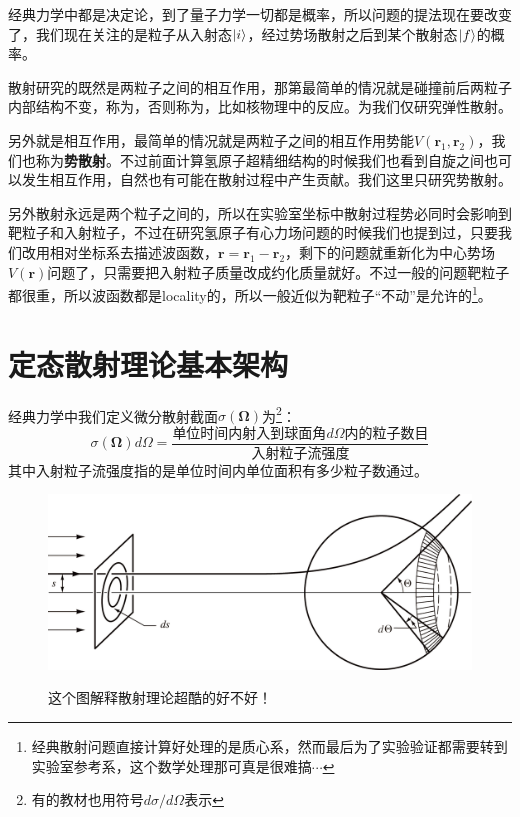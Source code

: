 \documentclass[a4paper,zihao=-4,linespread=1]{ctexrep}
\begin{document}
	经典力学中都是决定论，到了量子力学一切都是概率，所以问题的提法现在要改变了，我们现在关注的是粒子从入射态$\ket{i}$，经过势场散射之后到某个散射态$\ket{f}$的概率。
	
	散射研究的既然是两粒子之间的相互作用，那第最简单的情况就是碰撞前后两粒子内部结构不变，称为，否则称为，比如核物理中的反应。为我们仅研究弹性散射。
	
	另外就是相互作用，最简单的情况就是两粒子之间的相互作用势能$V(\mathbf{r}_1,\mathbf{r}_2)$，我们也称为\textbf{势散射}。不过前面计算氢原子超精细结构的时候我们也看到自旋之间也可以发生相互作用，自然也有可能在散射过程中产生贡献。我们这里只研究势散射。
	
	另外散射永远是两个粒子之间的，所以在实验室坐标中散射过程势必同时会影响到靶粒子和入射粒子，不过在研究氢原子有心力场问题的时候我们也提到过，只要我们改用相对坐标系去描述波函数，$\mathbf{r}=\mathbf{r}_1-\mathbf{r}_2$，剩下的问题就重新化为中心势场$V(\mathbf{r})$问题了，只需要把入射粒子质量改成约化质量就好。不过一般的问题靶粒子都很重，所以波函数都是locality的，所以一般近似为靶粒子“不动”是允许的\footnote{经典散射问题直接计算好处理的是质心系，然而最后为了实验验证都需要转到实验室参考系，这个数学处理那可真是很难搞$\cdots$}。
	
	\section{定态散射理论基本架构}
	经典力学中我们定义微分散射截面$\sigma(\mathbf{\Omega})$为\footnote{有的教材也用符号$d\sigma/d\Omega$表示}：
	\begin{equation}
		\label{eq:11.1}
		\sigma(\mathbf{\Omega})d\Omega=\frac{\text{单位时间内射入到球面角$d\Omega$内的粒子数目}}{\text{入射粒子流强度}}
	\end{equation}
	其中入射粒子流强度指的是单位时间内单位面积有多少粒子数通过。
	
	\begin{figure}[h]
		\centering	
		\includegraphics[width=0.8 \linewidth]{fig/10-1.png}
		\label{fig:10.1}
		\caption{这个图解释散射理论超酷的好不好！}
	\end{figure}
	
\end{document}
